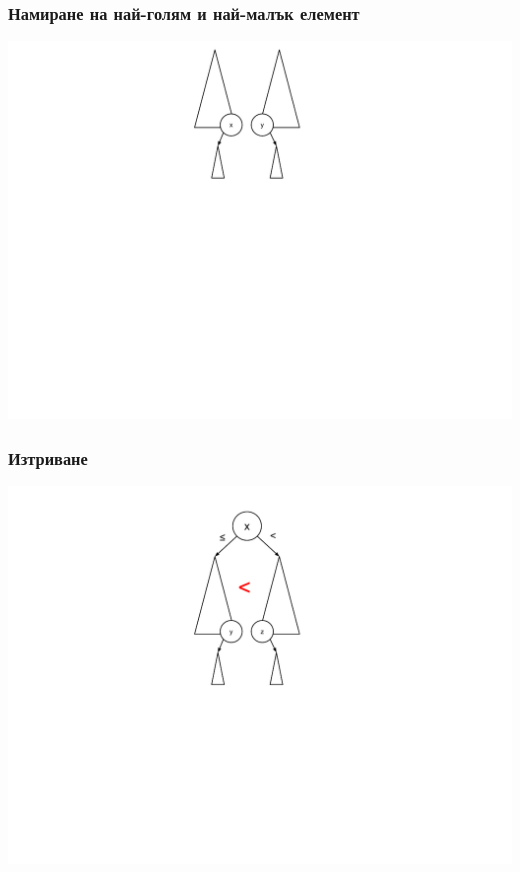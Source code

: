 \documentclass{beamer}
\begin{document}
\begin{frame}[fragile]
\frametitle{Намиране на най-голям и най-малък елемент}

\includegraphics[width=14cm]{images/tree_extremums}

\end{frame}

\begin{frame}[fragile]
\frametitle{Изтриване}

\includegraphics[width=14cm]{images/tree_delete_1}

\end{frame}
\end{document}
